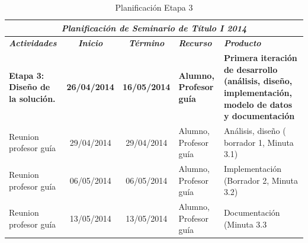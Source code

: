 \documentclass[12pt,letterpaper]{article}
\begin{document}
\begin{table}[htf]
\begin{tabular}{| p{4cm} | c | c | p{3cm}  | p{2.5cm} |}
\hline

\multicolumn{5}{|c|}{\textbf{\textit{Planificaci\'on de Seminario de T\'itulo I 2014}}} \\ \hline \hline
\textit{\textbf{Actividades}} & 
\textit{\textbf{Inicio}} & 
\textit{\textbf{T\'ermino}} & 
\centering \textit{\textbf{Recurso}} & 
\textit{\textbf{Producto}} \\ \hline \hline
\textbf{Etapa 3: Dise\~no de la soluci\'on.} & 
\textbf{26/04/2014} & 
\textbf{16/05/2014} & 
\textbf{Alumno, Profesor gu\'ia} & 
\textbf{Primera iteraci\'on de desarrollo (an\'alisis, dise\~no, implementaci\'on, modelo de datos y documentaci\'on} \\ \hline


Reunion profesor gu\'ia & 
29/04/2014 & 
29/04/2014 &  
Alumno, Profesor gu\'ia & 
An\'alisis, dise\~no ( borrador 1, Minuta 3.1)\\ \hline

Reunion profesor gu\'ia & 
06/05/2014 & 
06/05/2014 &  
Alumno, Profesor gu\'ia & 
Implementaci\'on (Borrador 2, Minuta 3.2) \\ \hline

Reunion profesor gu\'ia & 
13/05/2014 & 
13/05/2014 &  
Alumno, Profesor gu\'ia & 
Documentaci\'on (Minuta 3.3\\ \hline


\hline
\end{tabular}
\caption{Planificaci\'on Etapa 3}
\end{table}



\newpage
\clearpage

\end{document}
